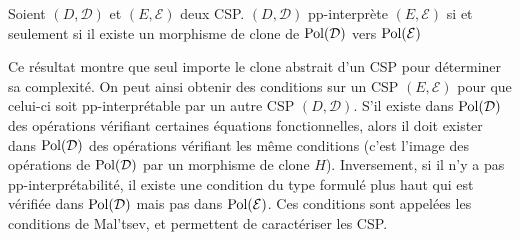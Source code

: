 \begin{theo}{}
    Soient $(D,\mathcal{D})$ et $(E,\mathcal{E})$ deux CSP.  $(D,\mathcal{D})$
    pp-interprète  $(E,\mathcal{E})$ si et seulement si il existe un morphisme
    de clone de $\text{Pol}(\mathcal{D})$ vers $\text{Pol}(\mathcal{E})$
\end{theo}

Ce résultat montre que seul importe le clone abstrait d'un CSP pour déterminer
sa complexité. On peut ainsi obtenir des conditions sur un CSP
$(E,\mathcal{E})$ pour que celui-ci soit pp-interprétable par un autre CSP
$(D,\mathcal{D})$. S'il existe dans $\text{Pol}(\mathcal{D})$ des opérations
vérifiant certaines équations fonctionnelles, alors il doit exister dans
$\text{Pol}(\mathcal{D})$ des opérations vérifiant les même conditions (c'est l'image
des opérations de $\text{Pol}(\mathcal{D})$ par un morphisme de clone $H$).
Inversement, si il n'y a pas pp-interprétabilité, il existe une condition du
type formulé plus haut qui est vérifiée dans $\text{Pol}(\mathcal{D})$ mais pas dans
$\text{Pol}(\mathcal{E})$. Ces conditions sont appelées les conditions de Mal'tsev, et
permettent de caractériser les CSP.

